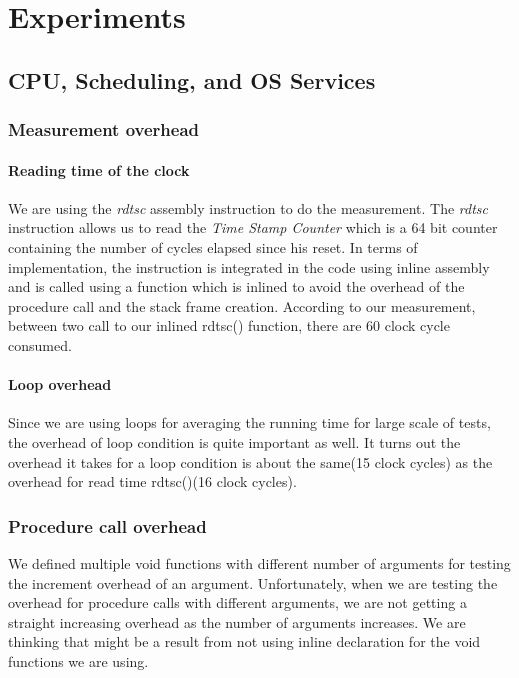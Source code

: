 \section{Experiments}



\subsection{CPU, Scheduling, and OS Services}

\subsubsection{Measurement overhead}

\paragraph{Reading time of the clock}
We are using the \emph{rdtsc} assembly instruction to do the measurement.
The \emph{rdtsc} instruction allows us to read the \emph{Time Stamp Counter}
which is a 64 bit counter containing the number of cycles elapsed since his
reset.
In terms of implementation, the instruction is integrated in the code using
inline assembly and is called using a function which is inlined to avoid the
overhead of the procedure call and the stack frame creation.
According to our measurement, between two call to our inlined rdtsc() function,
there are 60 clock cycle consumed.

\paragraph{Loop overhead}
Since we are using loops for averaging the running time for large scale of tests, the overhead of loop condition is quite important as well. It turns out the overhead it takes for a loop condition is about the same(15 clock cycles) as the overhead for read time rdtsc()(16 clock cycles).

\subsubsection{Procedure call overhead}
We defined multiple void functions with different number of arguments for testing the increment overhead of an argument. Unfortunately, when we are testing the overhead for procedure calls with different arguments, we are not getting a straight increasing overhead as the number of arguments increases. We are thinking that might be a result from not using inline declaration for the void functions we are using.


